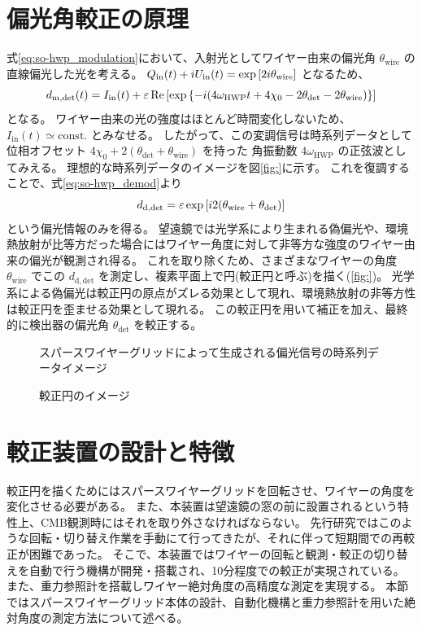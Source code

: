 \documentclass[../../main.tex]{subfiles}
\begin{document}
\section{偏光角較正の原理}
式\eqref{eq:so-hwp_modulation}において、入射光としてワイヤー由来の偏光角 $\theta_{\mathrm{wire}}$ の直線偏光した光を考える。
$Q_{\mathrm{in}}(t) + iU_{\mathrm{in}}(t) = \exp\qty[2i\theta_{\mathrm{wire}}]$ となるため、
\begin{equation}
    d_{\mathrm{m}, \mathrm{det}}(t) = I_{\mathrm{in}}(t) + \varepsilon\Re\qty[\exp\qty{-i \qty(4\omega_{\mathrm{HWP}}t + 4\chi_0 - 2\theta_{\mathrm{det}} - 2\theta_{\mathrm{wire}})}]
\end{equation}
となる。
ワイヤー由来の光の強度はほとんど時間変化しないため、$I_{\mathrm{in}}(t) \simeq \mathrm{const.}$ とみなせる。
したがって、この変調信号は時系列データとして位相オフセット $4\chi_0 + 2(\theta_{\mathrm{det}} + \theta_{\mathrm{wire}})$ を持った
角振動数 $4\omega_{\mathrm{HWP}}$ の正弦波としてみえる。
理想的な時系列データのイメージを図\ref{fig:}に示す。
これを復調することで、式\eqref{eq:so-hwp_demod}より
\begin{equation}
    d_{\mathrm{d, det}} = \varepsilon\exp\qty[i2\qty(\theta_{\mathrm{wire}} + \theta_{\mathrm{det}})]
    \label{eq:wiregrid_mod}
\end{equation}
という偏光情報のみを得る。
望遠鏡では光学系により生まれる偽偏光や、環境熱放射が比等方だった場合にはワイヤー角度に対して非等方な強度のワイヤー由来の偏光が観測され得る。
これを取り除くため、さまざまなワイヤーの角度 $\theta_{\mathrm{wire}}$ でこの $d_{\mathrm{d, det}}$ を測定し、複素平面上で円(較正円と呼ぶ)を描く(\ref{fig:})。
光学系による偽偏光は較正円の原点がズレる効果として現れ、環境熱放射の非等方性は較正円を歪ませる効果として現れる。
この較正円を用いて補正を加え、最終的に検出器の偏光角 $\theta_{\mathrm{det}}$ を較正する。
\begin{figure}[tbp]
    \centering
    \caption[スパースワイヤーグリッドによって生成される偏光信号の時系列データイメージ]{スパースワイヤーグリッドによって生成される偏光信号の時系列データイメージ}
\end{figure}
\begin{figure}[tbp]
    \centering
    \caption{較正円のイメージ}
\end{figure}
\section{較正装置の設計と特徴}
較正円を描くためにはスパースワイヤーグリッドを回転させ、ワイヤーの角度を変化させる必要がある。
また、本装置は望遠鏡の窓の前に設置されるという特性上、CMB観測時にはそれを取り外さなければならない。
先行研究ではこのような回転・切り替え作業を手動にて行ってきたが、それに伴って短期間での再較正が困難であった。
そこで、本装置ではワイヤーの回転と観測・較正の切り替えを自動で行う機構が開発・搭載され、10分程度での較正が実現されている。
また、重力参照計を搭載しワイヤー絶対角度の高精度な測定を実現する。
本節ではスパースワイヤーグリッド本体の設計、自動化機構と重力参照計を用いた絶対角度の測定方法について述べる。
\end{document}

